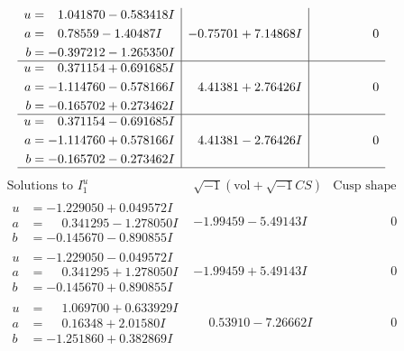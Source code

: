 \documentclass[1p]{elsarticle_modified}
\theoremstyle{definition}
\newcommand{\I}{\sqrt{-1}}
\begin{document}
$$\begin{array}{c|c|c}
\begin{aligned}
u &= \phantom{-}1.041870 - 0.583418 I \\
a &= \phantom{-}0.78559 - 1.40487 I \\
b &= -0.397212 - 1.265350 I\end{aligned}
 & -0.75701 + 7.14868 I & \phantom{-0.000000 } 0 \\ \hline\begin{aligned}
u &= \phantom{-}0.371154 + 0.691685 I \\
a &= -1.114760 - 0.578166 I \\
b &= -0.165702 + 0.273462 I\end{aligned}
 & \phantom{-}4.41381 + 2.76426 I & \phantom{-0.000000 } 0 \\ \hline\begin{aligned}
u &= \phantom{-}0.371154 - 0.691685 I \\
a &= -1.114760 + 0.578166 I \\
b &= -0.165702 - 0.273462 I\end{aligned}
 & \phantom{-}4.41381 - 2.76426 I & \phantom{-0.000000 } 0\\
 \hline 
 \end{array}$$\newpage$$\begin{array}{c|c|c}  
\text{Solutions to }I^u_{1}& \I (\text{vol} + \sqrt{-1}CS) & \text{Cusp shape}\\
 \hline 
\begin{aligned}
u &= -1.229050 + 0.049572 I \\
a &= \phantom{-}0.341295 - 1.278050 I \\
b &= -0.145670 - 0.890855 I\end{aligned}
 & -1.99459 - 5.49143 I & \phantom{-0.000000 } 0 \\ \hline\begin{aligned}
u &= -1.229050 - 0.049572 I \\
a &= \phantom{-}0.341295 + 1.278050 I \\
b &= -0.145670 + 0.890855 I\end{aligned}
 & -1.99459 + 5.49143 I & \phantom{-0.000000 } 0 \\ \hline\begin{aligned}
u &= \phantom{-}1.069700 + 0.633929 I \\
a &= \phantom{-}0.16348 + 2.01580 I \\
b &= -1.251860 + 0.382869 I\end{aligned}
 & \phantom{-}0.53910 - 7.26662 I & \phantom{-0.000000 } 0 \\ \hline\begin{aligned}

\end{aligned}
\end{array}$$
\end{document}
